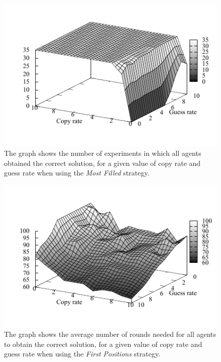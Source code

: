 \documentclass{article}
\begin{document}
\begin{figure}
\includegraphics[scale=1]{ijcai_sudoku/fill_suc}
\caption{The graph shows the number of experiments in which all agents obtained the correct solution, for a given value of copy rate and guess rate when using the \emph{Most Filled} strategy.
}
\label{fig:fill_suc}
\end{figure}

\begin{figure}
\includegraphics[scale=1]{ijcai_sudoku/first_iter}
\caption{The graph shows the average number of rounds needed for all agents to obtain the correct solution, for a given value of copy rate and guess rate when using the \emph{First Positions} strategy.
}
\label{fig:first_iter}
\end{figure}
\end{document}
